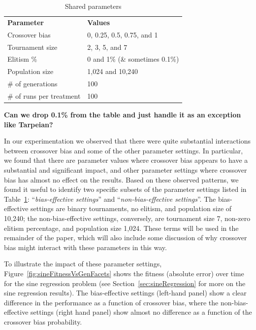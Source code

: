 \documentclass{sig-alternate}
\begin{document}
\begin{table}[tb]
\begin{center}
\begin{tabular}{ll}
\textbf{Parameter} & \textbf{Values} \\
Crossover bias & 0, 0.25, 0.5, 0.75, and 1 \\
Tournament size & 2, 3, 5, and 7 \\
Elitism \% & 0 and 1\% (\& sometimes 0.1\%) \\
Population size & 1,024 and 10,240 \\
\# of generations & 100 \\
\# of runs per treatment & 100
\end{tabular}
\end{center}
\vspace{-0.5cm}
\caption{Shared parameters}
\label{tab:sharedParameters}
\end{table}

\textbf{Can we drop 0.1\% from the table and just handle it as an exception like Tarpeian?}

In our experimentation we observed that
there were quite substantial interactions between crossover bias and some of
the other parameter settings. In particular, we found that there are parameter values where crossover bias appears to
have a substantial and significant impact, and other parameter settings where crossover bias has almost no effect on
the results. Based on these observed patterns, we found it useful to identify two specific subsets of the parameter
settings listed in Table~\ref{tab:sharedParameters}: ``\emph{bias-effective settings}'' and ``\emph{non-bias-effective
settings}''. The bias-effective settings are binary tournaments, no elitism, and population size of 10,240; the
non-bias-effective settings, conversely, are tournament size 7, non-zero elitism percentage, and population size 1,024.
These terms will be used in the remainder of the paper, which will also include some discussion of why crossover bias
might interact with these parameters in this way.

To illustrate the impact of these parameter settings, 
Figure~\ref{fig:sineFitnessVsGenFacets} shows the fitness (absolute error) over time for the sine regression problem
(see Section~\ref{sec:sineRegression} for more on the sine regression results). 
The bias-effective settings (left-hand panel) show a clear difference in the performance as a function of 
crossover bias, where the non-bias-effective settings (right hand panel) show almost no difference as a function of
the crossover bias probability.
\end{document}
